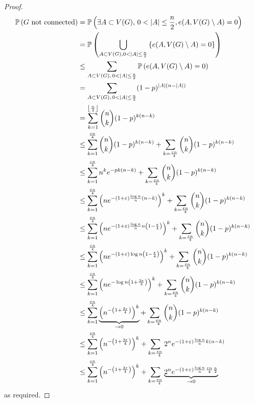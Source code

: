 \begin{proof}
	\begin{align*}
		\prob{G \text{ not connected}} &= \prob{\exists A \subset V(G),\, 0 < \abs{A} \leq \frac{n}{2}, e(A, V(G) \setminus A) = 0} \\
		&= \prob{\bigcup_{A \subset V(G), 0 < \abs{A} \leq \frac{n}{2}} \qty{e(A, V(G) \setminus A) = 0}} \\
		&\leq \sum_{A \subset V(G),\, 0 < \abs{A} \leq \frac{n}{2}} \prob{e(A, V(G) \setminus A) = 0} \\
		&= \sum_{A \subset V(G),\, 0 < \abs{A} \leq \frac{n}{2}} (1-p)^{\abs{A}(n-\abs{A})} \\
		&= \sum_{k=1}^{\floor*{\frac{n}{2}}} \binom{n}{k} (1-p)^{k (n-k)} \\
		&\leq \sum_{k=1}^{\frac{\varepsilon n}{4}} \binom n k (1-p)^{k (n-k)} + \sum_{k=\frac{\varepsilon n}{4}} \binom n k (1-p)^{k (n - k)} \\
		&\leq \sum_{k=1}^{\frac{\varepsilon n}{4}} n^k e^{-pk(n-k)} + \sum_{k=\frac{\varepsilon n}{4}} \binom n k (1-p)^{k (n - k)} \\
		&\leq \sum_{k=1}^{\frac{\varepsilon n}{4}} \qty(ne^{-(1+\varepsilon) \frac{\log n}{n} (n-k)})^k + \sum_{k=\frac{\varepsilon n}{4}} \binom n k (1-p)^{k (n - k)} \\
		&\leq \sum_{k=1}^{\frac{\varepsilon n}{4}} \qty(ne^{-(1+\varepsilon) \frac{\log n}{n} n\qty(1 - \frac{\varepsilon}{4})})^k + \sum_{k=\frac{\varepsilon n}{4}} \binom n k (1-p)^{k (n - k)} \\
		&\leq \sum_{k=1}^{\frac{\varepsilon n}{4}} \qty(ne^{-(1+\varepsilon) \log n \qty(1 - \frac{\varepsilon}{4})})^k + \sum_{k=\frac{\varepsilon n}{4}} \binom n k (1-p)^{k (n - k)} \\
		&\leq \sum_{k=1}^{\frac{\varepsilon n}{4}} \qty(ne^{-\log n\qty(1+\frac{3\varepsilon}{4})})^k + \sum_{k=\frac{\varepsilon n}{4}} \binom n k (1-p)^{k (n - k)} \\
		&\leq \sum_{k=1}^{\frac{\varepsilon n}{4}} \underbrace{\qty(n^{-\qty(1+\frac{3\varepsilon}{4})})^k}_{\to 0} + \sum_{k=\frac{\varepsilon n}{4}} \binom n k (1-p)^{k (n - k)} \\
		&\leq \sum_{k=1}^{\frac{\varepsilon n}{4}} \qty(n^{-\qty(1+\frac{3\varepsilon}{4})})^k + \sum_{k=\frac{\varepsilon n}{4}} 2^n e^{-(1 + \varepsilon) \frac{\log n}{n} k(n-k)} \\
		&\leq \sum_{k=1}^{\frac{\varepsilon n}{4}} \qty(n^{-\qty(1+\frac{3\varepsilon}{4})})^k + \sum_{k=\frac{\varepsilon n}{4}} \underbrace{2^n e^{-(1 + \varepsilon) \frac{\log n}{n} \frac{\varepsilon n}{4} \frac{n}{2}}}_{\to 0}
	\end{align*}
	as required.
\end{proof}

